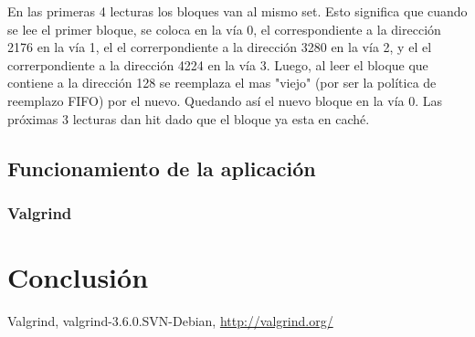 \documentclass[a4paper, 10pt, twoside, notitlepage]{article}
\begin{document}
En las primeras 4 lecturas los bloques van al mismo set. Esto significa que cuando se lee el primer bloque, se coloca en la vía 0, el correspondiente a la dirección 2176 en la vía 1, el el correrpondiente a la dirección 3280 en la vía 2, y el el correrpondiente a la dirección 4224 en la vía 3. Luego, al leer el bloque que contiene a la dirección 128 se reemplaza el mas "viejo" (por ser la política de reemplazo FIFO) por el nuevo. Quedando así el nuevo bloque en la vía 0. Las próximas 3 lecturas dan hit dado que el bloque ya esta en caché.


\subsection{Funcionamiento de la aplicación}

\subsubsection{Valgrind}

\section{Conclusión}


\vspace{.5cm}
\begin{thebibliography}{5}
  Valgrind, valgrind-3.6.0.SVN-Debian, \url{http://valgrind.org/}
\end{thebibliography}

 
\newpage
\end{document}
